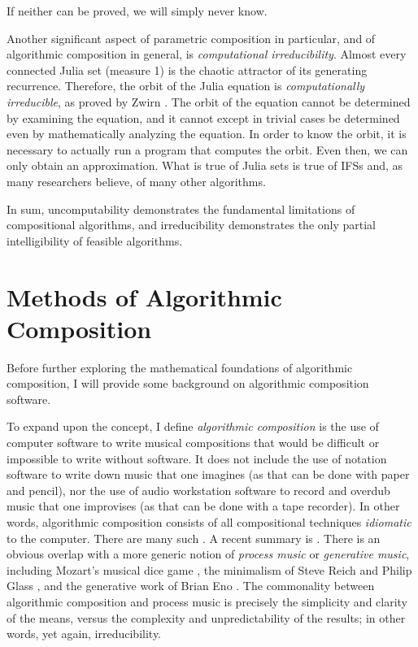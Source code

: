 \documentclass[11pt,papersize=a4]{scrartcl}
\begin{document}
If neither can be proved, we will simply never know.

Another significant aspect of parametric composition in particular, and of algorithmic composition in general, is \emph{computational irreducibility}. Almost every connected Julia set (measure 1) is the chaotic attractor of its generating recurrence. Therefore, the orbit of the Julia equation is \emph{computationally irreducible}, as proved by Zwirn \parencite{zwirn2015computational}. The orbit of the equation cannot be determined by examining the equation, and it cannot except in trivial cases be determined even by mathematically analyzing the equation. In order to know the orbit, it is necessary to actually run a program that computes the orbit. Even then, we can only obtain an approximation. What is true of Julia sets is true of IFSs and, as many researchers believe, of many other algorithms.

In sum, uncomputability demonstrates the fundamental limitations of compositional algorithms, and irreducibility demonstrates the only partial intelligibility of feasible algorithms.

\section*{Methods of Algorithmic Composition}

Before further exploring the mathematical foundations of algorithmic composition, I will provide some background on algorithmic composition software.

To expand upon the concept, I define \emph{algorithmic composition} is the use of computer software to write musical compositions that would be difficult or impossible to write without software. It does not include the use of notation software to write down music that one imagines (as that can be done with paper and pencil), nor the use of audio workstation software to record and overdub music that one improvises (as that can be done with a tape recorder). In other words, algorithmic composition consists of all compositional techniques \emph{idiomatic} to the computer. There are many such \parencite{fernandez2013ai, arizanet}. A recent summary is \parencite{mclean2018oxford}. There is an obvious overlap with a more generic notion of \emph{process music} or \emph{generative music}, including Mozart's musical dice game \parencite{humdrumdice}, the minimalism of Steve Reich \parencite{reichprocess, 10.2307/832600} and Philip Glass \parencite{potter2002four, glass2015words}, and the generative work of Brian Eno \parencite{eno1996generative}. The commonality between algorithmic composition and process music is precisely the simplicity and clarity of the means, versus the complexity and unpredictability of the results; in other words, yet again, irreducibility. 
\end{document}
